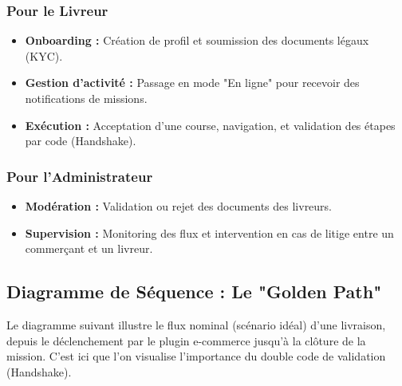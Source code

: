 \subsubsection{Pour le Livreur}
\begin{itemize}
    \item \textbf{Onboarding :} Création de profil et soumission des documents légaux (KYC).
    \item \textbf{Gestion d'activité :} Passage en mode "En ligne" pour recevoir des notifications de missions.
    \item \textbf{Exécution :} Acceptation d'une course, navigation, et validation des étapes par code (Handshake).
\end{itemize}

\subsubsection{Pour l'Administrateur}
\begin{itemize}
    \item \textbf{Modération :} Validation ou rejet des documents des livreurs.
    \item \textbf{Supervision :} Monitoring des flux et intervention en cas de litige entre un commerçant et un livreur.
\end{itemize}

\subsection{Diagramme de Séquence : Le "Golden Path"}
\label{subsec:sequence_golden_path}

Le diagramme suivant illustre le flux nominal (scénario idéal) d'une livraison, depuis le déclenchement par le plugin e-commerce jusqu'à la clôture de la mission. C'est ici que l'on visualise l'importance du double code de validation (Handshake).





